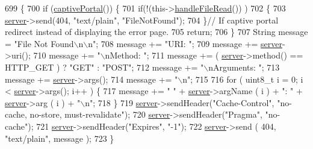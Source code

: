 \begin{DoxyCode}
699                                  \{
700   \textcolor{keywordflow}{if} (\hyperlink{class_wi_fi_manager_a4ef4298deb224212e5242c456669a973}{captivePortal}()) \{
701     \textcolor{keywordflow}{if}(!(this->\hyperlink{class_wi_fi_manager_abed7fbbdab409fc8aba2a5c00f3d2db1}{handleFileRead}()) )
702     \{
703     \hyperlink{class_wi_fi_manager_a509523a01c0395cf0dc235b074f2a5ea}{server}->send(404, \textcolor{stringliteral}{"text/plain"}, \textcolor{stringliteral}{"FileNotFound"});
704     \}\textcolor{comment}{// If captive portal redirect instead of displaying the error page.}
705     \textcolor{keywordflow}{return};
706   \}
707   String message = \textcolor{stringliteral}{"File Not Found\(\backslash\)n\(\backslash\)n"};
708   message += \textcolor{stringliteral}{"URI: "};
709   message += \hyperlink{class_wi_fi_manager_a509523a01c0395cf0dc235b074f2a5ea}{server}->uri();
710   message += \textcolor{stringliteral}{"\(\backslash\)nMethod: "};
711   message += ( \hyperlink{class_wi_fi_manager_a509523a01c0395cf0dc235b074f2a5ea}{server}->method() == HTTP\_GET ) ? \textcolor{stringliteral}{"GET"} : \textcolor{stringliteral}{"POST"};
712   message += \textcolor{stringliteral}{"\(\backslash\)nArguments: "};
713   message += \hyperlink{class_wi_fi_manager_a509523a01c0395cf0dc235b074f2a5ea}{server}->args();
714   message += \textcolor{stringliteral}{"\(\backslash\)n"};
715 
716   \textcolor{keywordflow}{for} ( uint8\_t i = 0; i < \hyperlink{class_wi_fi_manager_a509523a01c0395cf0dc235b074f2a5ea}{server}->args(); i++ ) \{
717     message += \textcolor{stringliteral}{" "} + \hyperlink{class_wi_fi_manager_a509523a01c0395cf0dc235b074f2a5ea}{server}->argName ( i ) + \textcolor{stringliteral}{": "} + \hyperlink{class_wi_fi_manager_a509523a01c0395cf0dc235b074f2a5ea}{server}->arg ( i ) + \textcolor{stringliteral}{"\(\backslash\)n"};
718   \}
719   \hyperlink{class_wi_fi_manager_a509523a01c0395cf0dc235b074f2a5ea}{server}->sendHeader(\textcolor{stringliteral}{"Cache-Control"}, \textcolor{stringliteral}{"no-cache, no-store, must-revalidate"});
720   \hyperlink{class_wi_fi_manager_a509523a01c0395cf0dc235b074f2a5ea}{server}->sendHeader(\textcolor{stringliteral}{"Pragma"}, \textcolor{stringliteral}{"no-cache"});
721   \hyperlink{class_wi_fi_manager_a509523a01c0395cf0dc235b074f2a5ea}{server}->sendHeader(\textcolor{stringliteral}{"Expires"}, \textcolor{stringliteral}{"-1"});
722   \hyperlink{class_wi_fi_manager_a509523a01c0395cf0dc235b074f2a5ea}{server}->send ( 404, \textcolor{stringliteral}{"text/plain"}, message );
723 \}
\end{DoxyCode}
